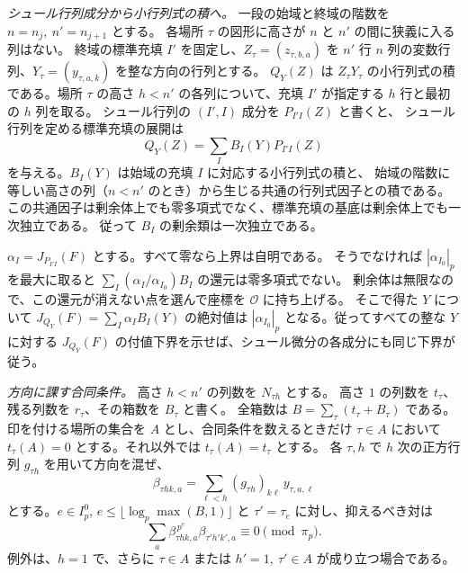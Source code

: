\emph{シュール行列成分から小行列式の積へ。}
一段の始域と終域の階数を \(n=n_j,\ n'=n_{j+1}\) とする。
各場所 \(\tau\) の図形に高さが \(n\) と \(n'\) の間に狭義に入る列はない。
終域の標準充填 \(I'\) を固定し、\(Z_\tau=(z_{\tau,b,a})\) を
\(n'\) 行 \(n\) 列の変数行列、\(Y_\tau=(y_{\tau,a,k})\) を整な方向の行列とする。
\(Q_Y(Z)\) は \(Z_\tau Y_\tau\) の小行列式の積である。場所 \(\tau\) の高さ
\(h<n'\) の各列について、充填 \(I'\) が指定する \(h\) 行と最初の \(h\) 列を取る。
シュール行列の \((I',I)\) 成分を \(P_{I'I}(Z)\) と書くと、
シュール行列を定める標準充填の展開は
\[
 Q_Y(Z)=\sum_I B_I(Y)P_{I'I}(Z)
\]
を与える。\(B_I(Y)\) は始域の充填 \(I\) に対応する小行列式の積と、
始域の階数に等しい高さの列（\(n<n'\) のとき）から生じる共通の行列式因子との積である。
この共通因子は剰余体上でも零多項式でなく、標準充填の基底は剰余体上でも一次独立である。
従って \(B_I\) の剰余類は一次独立である。

\(\alpha_I=J_{P_{I'I}}(F)\) とする。すべて零なら上界は自明である。
そうでなければ \(|\alpha_{I_0}|_p\) を最大に取ると
\(\sum_I(\alpha_I/\alpha_{I_0})B_I\) の還元は零多項式でない。
剰余体は無限なので、この還元が消えない点を選んで座標を \(\mathcal O\) に持ち上げる。
そこで得た \(Y\) について
\(J_{Q_Y}(F)=\sum_I\alpha_I B_I(Y)\) の絶対値は
\(|\alpha_{I_0}|_p\) となる。従ってすべての整な \(Y\) に対する
\(J_{Q_Y}(F)\) の付値下界を示せば、シュール微分の各成分にも同じ下界が従う。

\emph{方向に課す合同条件。}
高さ \(h<n'\) の列数を \(N_{\tau h}\) とする。
高さ \(1\) の列数を \(t_\tau\)、残る列数を \(r_\tau\)、その箱数を \(B_\tau\) と書く。
全箱数は \(B=\sum_\tau(t_\tau+B_\tau)\) である。
印を付ける場所の集合を \(A\) とし、合同条件を数えるときだけ
\(\tau\in A\) において \(t_\tau(A)=0\) とする。それ以外では \(t_\tau(A)=t_\tau\) とする。
各 \(\tau,h\) で \(h\) 次の正方行列 \(g_{\tau h}\) を用いて方向を混ぜ、
\[
 \beta_{\tau h k,a}=\sum_{\ell<h}(g_{\tau h})_{k\ell}\,y_{\tau,a,\ell}
\]
とする。\(e\in I_p^0\), \(e\le\lfloor\log_p\max(B,1)\rfloor\) と
\(\tau'=\tau_e\) に対し、抑えるべき対は
\begin{equation}\label{eq:upper-direction-pairing}
 \sum_a\beta_{\tau h k,a}^{\,p^e}\beta_{\tau' h' k',a}\equiv 0
   \pmod{\pi_p}.
\end{equation}
例外は、\(h=1\) で、さらに \(\tau\in A\) または \(h'=1,\ \tau'\in A\) が成り立つ場合である。

